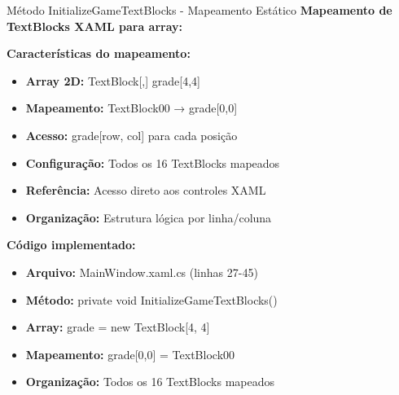 \documentclass[aspectratio=169]{beamer}
\begin{document}
\begin{frame}{Método InitializeGameTextBlocks - Mapeamento Estático}
\textbf{Mapeamento de TextBlocks XAML para array:}

\textbf{Características do mapeamento:}
\begin{itemize}
    \item \textbf{Array 2D:} TextBlock[,] grade[4,4]
    \item \textbf{Mapeamento:} TextBlock00 → grade[0,0]
    \item \textbf{Acesso:} grade[row, col] para cada posição
    \item \textbf{Configuração:} Todos os 16 TextBlocks mapeados
    \item \textbf{Referência:} Acesso direto aos controles XAML
    \item \textbf{Organização:} Estrutura lógica por linha/coluna
\end{itemize}

\textbf{Código implementado:}
\begin{itemize}
    \item \textbf{Arquivo:} MainWindow.xaml.cs (linhas 27-45)
    \item \textbf{Método:} private void InitializeGameTextBlocks()
    \item \textbf{Array:} grade = new TextBlock[4, 4]
    \item \textbf{Mapeamento:} grade[0,0] = TextBlock00
    \item \textbf{Organização:} Todos os 16 TextBlocks mapeados
\end{itemize}
\end{frame}
\end{document}
